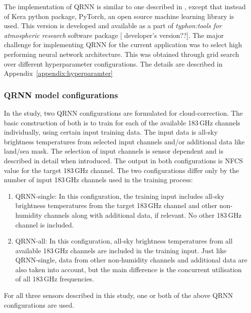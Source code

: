 \documentclass[amt, manuscript]{copernicus}
\newcommand{\todo}[1]{{\color{red} #1}}
\begin{document}
The implementation of QRNN is similar to one described in \citet{pfreundschuh:aneur:18}, except that instead of Kera python package, PyTorch, an open source machine learning
library \citep{paszke2017automatic} is used. This version is developed and available as a part of \textit{typhon:tools for atmospheric research} software package [\todo{developer's version??}]. The major challenge for implementing QRNN for the current application was to select high performing neural network architecture. This was obtained through grid search over different hyperparameter configurations. The details are described in Appendix~\ref{appendix:hyperparamter}

\subsubsection{QRNN model configurations}
%
In the study, two QRNN configurations are formulated for cloud-correction. The basic construction of both is to train for each of the available 183\,GHz channels individually, using certain input training data. The input data is all-sky brightness temperatures from selected input channels and/or additional data like land/sea mask. The selection of input channels is sensor dependent and is described in detail when introduced. The output in both configurations is NFCS value for the target 183\,GHz channel. The two configurations differ only by the number of input 183\,GHz channels used in the training process:

\begin{enumerate}
	\item QRNN-single: In this configuration, the training input includes all-sky brightness temperatures from the target 183\,GHz channel and other non-humidity channels along with additional data, if relevant. No other 183\,GHz channel is included.  
	
	\item QRNN-all: In this configuration, all-sky brightness temperatures from all available 183\,GHz channels are included in the training input. Just like QRNN-single, data from other non-humidity channels and additional data are also taken into account, but the main difference is the concurrent utilisation of all 183\,GHz frequencies.      
\end{enumerate}

For all three sensors described in this study, one or both of the above QRNN configurations are used. 
\end{document}
